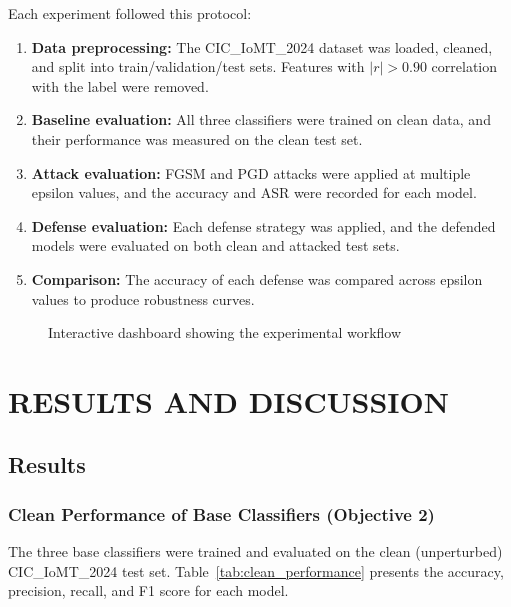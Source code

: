 \documentclass[12pt,a4paper,oneside]{report}
\begin{document}
Each experiment followed this protocol:

\begin{enumerate}
    \item \textbf{Data preprocessing:} The CIC\_IoMT\_2024 dataset was loaded, cleaned, and split into train/validation/test sets. Features with $|r| > 0.90$ correlation with the label were removed.
    \item \textbf{Baseline evaluation:} All three classifiers were trained on clean data, and their performance was measured on the clean test set.
    \item \textbf{Attack evaluation:} FGSM and PGD attacks were applied at multiple epsilon values, and the accuracy and ASR were recorded for each model.
    \item \textbf{Defense evaluation:} Each defense strategy was applied, and the defended models were evaluated on both clean and attacked test sets.
    \item \textbf{Comparison:} The accuracy of each defense was compared across epsilon values to produce robustness curves.
\end{enumerate}

\begin{figure}[H]
    \centering
    \caption{Interactive dashboard showing the experimental workflow}\label{fig:dashboard}
\end{figure}


\chapter{RESULTS AND DISCUSSION}

\section{Results}

\subsection{Clean Performance of Base Classifiers (Objective 2)}

The three base classifiers were trained and evaluated on the clean (unperturbed) CIC\_IoMT\_2024 test set. Table~\ref{tab:clean_performance} presents the accuracy, precision, recall, and F1 score for each model.
\end{document}
